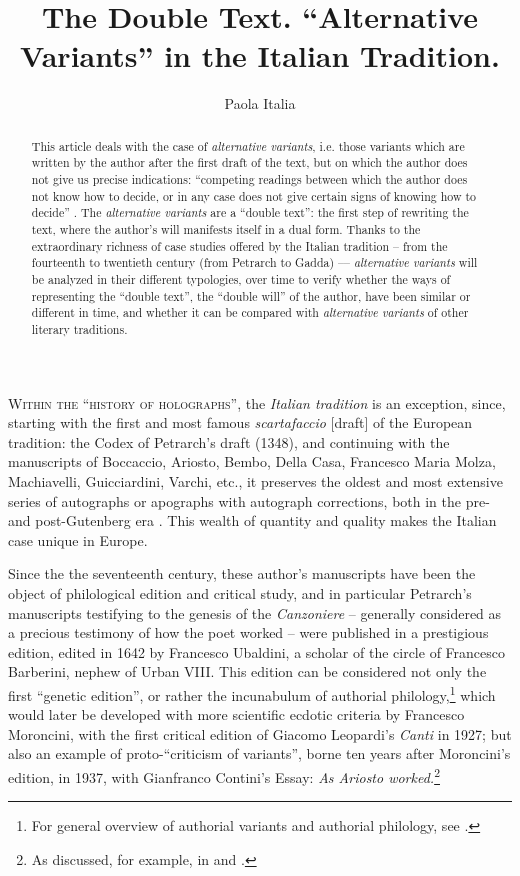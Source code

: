 \documentclass{article}
\author{Paola Italia}
\title{The Double Text. ``Alternative Variants'' in the Italian Tradition.}
\begin{document}
\maketitle


\begin{abstract}
This article deals with the case of \emph{alternative variants}, i.e.
those variants which are written by the author after the first draft of
the text, but on which the author does not give us precise indications:
``competing readings between which the author does not know how to
decide, or in any case does not give certain signs of knowing how to
decide'' \parencite[xxxv]{isella_nota_1983}. The \emph{alternative variants} are a ``double text'': the
first step of rewriting the text, where the author's will manifests
itself in a dual form. Thanks to the extraordinary richness of case
studies offered by the Italian tradition – from the fourteenth to twentieth century (from
Petrarch to Gadda) –– \emph{alternative variants} will be analyzed in
their different typologies, over time to verify whether the ways of
representing the ``double text'', the ``double will'' of the author,
have been similar or different in time, and whether it can be compared
with \emph{alternative variants} of other literary traditions.
\end{abstract}


\section*{}
\textsc{Within the ``history of holographs'',} the \emph{Italian
tradition} is an exception, since, starting with the first and most
famous \emph{scartafaccio} [draft] of the European tradition: the Codex of
Petrarch's draft (1348), and continuing with the manuscripts of
Boccaccio, Ariosto, Bembo, Della Casa, Francesco Maria Molza,
Machiavelli, Guicciardini, Varchi, etc., it preserves the oldest and
most extensive series of autographs or apographs with autograph
corrections, both in the pre- and post-Gutenberg era \parencite{italia_italian_nodate}. This wealth of
quantity and quality makes the Italian case unique in Europe.

Since the the seventeenth century, these author's manuscripts have been the object of
philological edition and critical study, and in particular Petrarch's
manuscripts testifying to the genesis of the \emph{Canzoniere} – generally
considered as a precious testimony of how the poet worked – were published
in a prestigious edition, edited in 1642 by Francesco Ubaldini, a
scholar of the circle of Francesco Barberini, nephew of Urban VIII. This
edition can be considered not only the first ``genetic edition'', or
rather the incunabulum of authorial philology,\footnote{For general
  overview of authorial variants and authorial philology, see \cite{italia_what_2021}.} which would later be
developed with more scientific ecdotic criteria by Francesco Moroncini,
with the first critical edition of Giacomo Leopardi's \emph{Canti}
in 1927; but also an example of proto-``criticism of variants'', borne ten
years after Moroncini's edition, in 1937, with Gianfranco Contini's
Essay: \emph{As Ariosto worked.}\footnote{As discussed, for example, in \cite{brugnolo_incunabula_2021} and \cite{italia_alle_2018}.}
\end{document}

